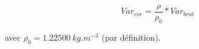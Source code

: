 \[
Var_{cor} = \frac{\rho}{\rho_0} * Var_{brut}
\]

avec $\rho_0 = 1.22500\ kg.m^{-3}$ (par d\'efinition).

